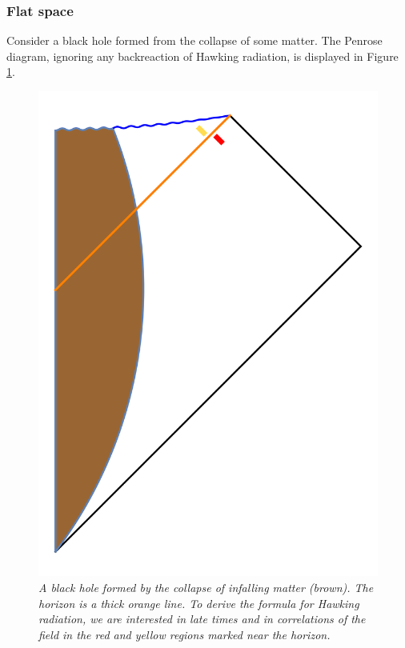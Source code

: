 \documentclass[12pt]{article}
\begin{document}
\subsubsection{Flat space \label{secflathawkingrad}}
Consider a black hole formed from the collapse of some matter. The Penrose diagram, ignoring any backreaction of Hawking radiation, is displayed in Figure \ref{naivepenrose}.
\begin{figure}[!ht]
\begin{center}
\includegraphics[height=0.4\textheight]{naivepenrose.png}
\caption{\em A black hole formed by the collapse of infalling matter (brown). The horizon is a thick orange line. To derive the formula for Hawking radiation, we are interested in late times and in correlations of the field in the red and yellow regions marked near the horizon. \label{naivepenrose}}
\end{center}
\end{figure}
\end{document}
